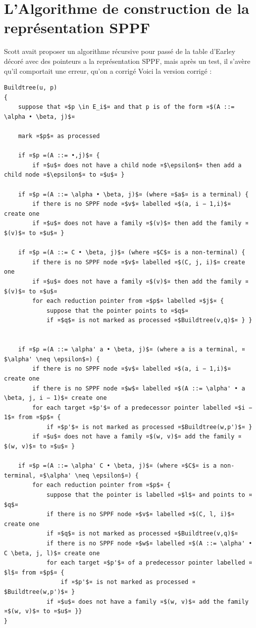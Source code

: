 \documentclass[10pt]{report}
\begin{document}
\section{L'Algorithme de construction de la représentation SPPF}
Scott\cite{Scott} avait proposer un algorithme récursive pour passé de la table d'Earley décoré avec des pointeurs a la représentation SPPF, mais après un test, il s'avère qu'il comportait une erreur, qu'on a corrigé
Voici la version corrigé :
\begin{lstlisting}[frame=single]
Buildtree(u, p) 
{
	suppose that ¤$p \in E_i$¤ and that p is of the form ¤$(A ::= \alpha • \beta, j)$¤
	
	mark ¤$p$¤ as processed
	
	if ¤$p =(A ::= •,j)$¤ {
		if ¤$u$¤ does not have a child node ¤$\epsilon$¤ then add a child node ¤$\epsilon$¤ to ¤$u$¤ }
		
	if ¤$p =(A ::= \alpha • \beta, j)$¤ (where ¤$a$¤ is a terminal) {
		if there is no SPPF node ¤$v$¤ labelled ¤$(a, i − 1,i)$¤ create one
		if ¤$u$¤ does not have a family ¤$(v)$¤ then add the family ¤$(v)$¤ to ¤$u$¤ }
		
	if ¤$p =(A ::= C • \beta, j)$¤ (where ¤$C$¤ is a non-terminal) {
		if there is no SPPF node ¤$v$¤ labelled ¤$(C, j, i)$¤ create one
		if ¤$u$¤ does not have a family ¤$(v)$¤ then add the family ¤$(v)$¤ to ¤$u$¤ 
		for each reduction pointer from ¤$p$¤ labelled ¤$j$¤ {
			suppose that the pointer points to ¤$q$¤
			if ¤$q$¤ is not marked as processed ¤$Buildtree(v,q)$¤ } }
			
			
	if ¤$p =(A ::= \alpha' a • \beta, j)$¤ (where a is a terminal, ¤$\alpha' \neq \epsilon$¤) {
		if there is no SPPF node ¤$v$¤ labelled ¤$(a, i − 1,i)$¤ create one
		if there is no SPPF node ¤$w$¤ labelled ¤$(A ::= \alpha' • a \beta, j, i − 1)$¤ create one
		for each target ¤$p'$¤ of a predecessor pointer labelled ¤$i − 1$¤ from ¤$p$¤ {
			if ¤$p'$¤ is not marked as processed ¤$Buildtree(w,p')$¤ }
		if ¤$u$¤ does not have a family ¤$(w, v)$¤ add the family ¤$(w, v)$¤ to ¤$u$¤ }
			
	if ¤$p =(A ::= \alpha' C • \beta, j)$¤ (where ¤$C$¤ is a non-terminal, ¤$\alpha' \neq \epsilon$¤) {
		for each reduction pointer from ¤$p$¤ {
			suppose that the pointer is labelled ¤$l$¤ and points to ¤$q$¤
			if there is no SPPF node ¤$v$¤ labelled ¤$(C, l, i)$¤ create one
			if ¤$q$¤ is not marked as processed ¤$Buildtree(v,q)$¤
			if there is no SPPF node ¤$w$¤ labelled ¤$(A ::= \alpha' • C \beta, j, l)$¤ create one 
			for each target ¤$p'$¤ of a predecessor pointer labelled ¤$l$¤ from ¤$p$¤ {
				if ¤$p'$¤ is not marked as processed ¤$Buildtree(w,p')$¤ }
			if ¤$u$¤ does not have a family ¤$(w, v)$¤ add the family ¤$(w, v)$¤ to ¤$u$¤ }}
}
		
		
\end{lstlisting}
\end{document}
